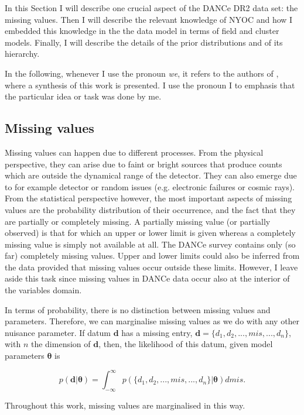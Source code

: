 In this Section I will describe one crucial aspect of the DANCe DR2 data set: the missing values. Then I will describe the relevant knowledge of NYOC and how I embedded this knowledge in the the data model in terms of field and cluster models. Finally, I will describe the details of the prior distributions and of its hierarchy. 

In the following, whenever I use the pronoun \emph{we}, it refers to the authors of \citet{Olivares2017}, where a synthesis of this work is presented. I use the pronoun I to emphasis that the particular idea or task was done by me.

\subsection{Missing values}
Missing values can happen due to different processes. From the physical perspective, they can arise due to faint or bright sources that produce counts which are outside the dynamical range of the detector. They can also emerge due to for example detector or random issues (e.g. electronic failures or cosmic rays). From the statistical perspective however, the most important aspects of missing values are the probability distribution of their occurrence, and the fact that they are partially or completely missing. A partially missing value (or partially observed) is that for which an upper or lower limit is given whereas a completely missing value is simply not available at all. The DANCe survey contains only (so far) completely missing values. Upper and lower limits could also be inferred from the data provided that missing values occur outside these limits. However, I leave aside this task since missing values in DANCe data occur also at the interior of the variables domain.

In terms of probability, there is no distinction between missing values and parameters. Therefore, we can marginalise missing values as we do with any other nuisance parameter. If datum $\mathbf{d}$ has a missing entry, $\mathbf{d}=\{d_1,d_2,...,{mis},...,d_n\}$, with $n$ the dimension of $\mathbf{d}$, then, the likelihood of this datum, given model parameters $\mathbf{\theta}$ is

\begin{equation}
\label{eq:marginalmiss}
p(\mathbf{d}|\mathbf{\theta})= \int_{-\infty}^{\infty} p(\{d_1,d_2,...,mis,...,d_n\}|\mathbf{\theta})d{mis}.
\end{equation}

Throughout this work, missing values are marginalised in this way.

